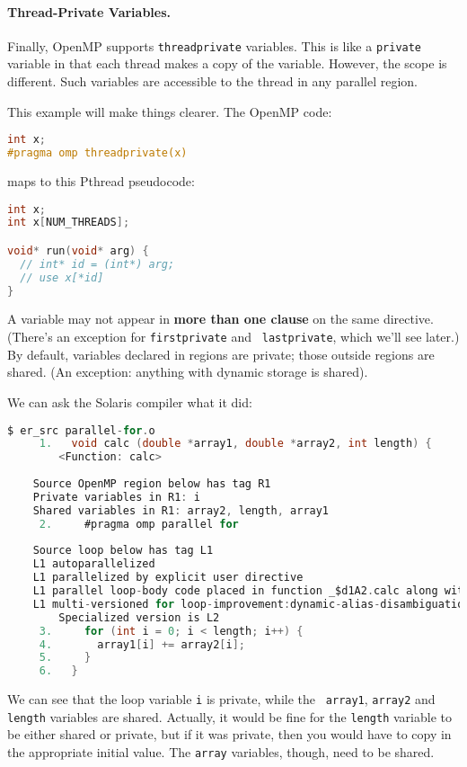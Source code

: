 \paragraph{Thread-Private Variables.} Finally, OpenMP supports 
{\tt threadprivate} variables. This is like a {\tt private} variable
in that each thread makes a copy of the variable. However, the scope 
is different. Such variables are accessible to the thread in any parallel region.

This example will make things clearer. The OpenMP code:
  \begin{lstlisting}[language=C]
int x;
#pragma omp threadprivate(x)
  \end{lstlisting}
  maps to this Pthread pseudocode:
  \begin{lstlisting}[language=C]
int x;
int x[NUM_THREADS];

void* run(void* arg) {
  // int* id = (int*) arg;
  // use x[*id]
}
  \end{lstlisting}

A variable may not appear in {\bf more than one clause} on the same
directive. (There's an exception for {\tt firstprivate} and {\tt
  lastprivate}, which we'll see later.) By default, variables
declared in regions are private; those outside regions are
shared. (An exception: anything with dynamic storage is
shared).


We can ask the Solaris compiler what it did:
{ 
\begin{lstlisting}[language=C,morekeywords={foreach,pragma,omp,parallel,single,nowait,task,untied,barrier,taskyield}]
$ er_src parallel-for.o
     1.   void calc (double *array1, double *array2, int length) {
        <Function: calc>
    
    Source OpenMP region below has tag R1
    Private variables in R1: i
    Shared variables in R1: array2, length, array1
     2.     #pragma omp parallel for
    
    Source loop below has tag L1
    L1 autoparallelized
    L1 parallelized by explicit user directive
    L1 parallel loop-body code placed in function _$d1A2.calc along with 0 inner loops
    L1 multi-versioned for loop-improvement:dynamic-alias-disambiguation. 
        Specialized version is L2
     3.     for (int i = 0; i < length; i++) {
     4.       array1[i] += array2[i];
     5.     }
     6.   }
\end{lstlisting}
}

We can see that the loop variable {\tt i} is private, while the {\tt
  array1}, {\tt array2} and {\tt length} variables are shared.
Actually, it would be fine for the {\tt length} variable to be either
shared or private, but if it was private, then you would have to copy
in the appropriate initial value. The {\tt array} variables, though, 
need to be shared.

